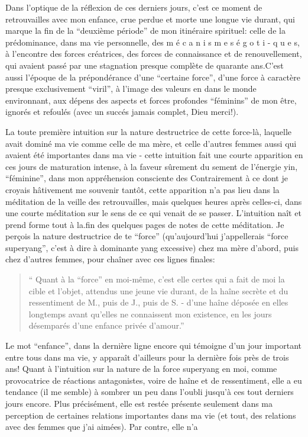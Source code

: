 
Dans l'optique de la réflexion de ces derniers jours, c'est ce moment de retrouvailles avec mon enfance, crue perdue et morte une longue vie durant, qui marque la fin de la ``deuxième période'' de mon itinéraire spirituel: celle de la prédominance, dans ma vie personnelle, des m é c a n i s m e s é g o t i - q u e s, à l'encontre des forces créatrices, des forces de connaissance et de renouvellement, qui avaient passé par une stagnation presque complète de quarante ans.C'est aussi l'époque de la prépondérance d'une ``certaine force'', d'une force à caractère presque exclusivement ``viril'', à l'image des valeurs en  dans le monde environnant, aux dépens des aspects et forces profondes ``féminins'' de mon être, ignorés et refoulés (avec un succés jamais complet, Dieu merci!).

La toute première intuition sur la nature destructrice de cette force-là, laquelle avait dominé ma vie comme celle de ma mère, et celle d'autres femmes aussi qui avaient été importantes dans ma vie - cette intuition fait une courte apparition en ces jours de maturation intense, à la faveur sûrement du \newline sement de l'énergie yin, ``féminine'', dans mon appréhension consciente des  Contrairement à ce dont je croyais hâtivement me souvenir tantôt, cette apparition n'a pas lieu dans la méditation de la veille des retrouvailles, mais quelques heures après celles-ci, dans une courte méditation sur le sens de ce qui venait de se passer. L'intuition naît et prend forme tout à la.fin des quelques pages de notes de cette méditation. Je perçois la nature destructrice de \newline te ``force'' (qu'aujourd'hui j'appellerais ``force superyang'', c'est à dire à dominante yang excessive) chez ma mère d'abord, puis chez d'autres femmes, pour chaîner avec ces lignes finales:

\begin{quote}
`` Quant à la ``force'' en moi-même, c'est elle certes qui a fait de moi la cible et l'objet, attendus une jeune vie durant, de la haîne secrète et du ressentiment de M., puis de J., puis de S. - d'une haîne déposée en elles longtemps avant qu'elles ne connaissent mon existence, en les jours désemparés d'une enfance privée d'amour.''
\end{quote}

Le mot ``enfance'', dans la dernière ligne encore qui témoigne d'un jour important entre tous dans ma vie, y apparaît d'ailleurs pour la dernière fois  près de trois ans! Quant à l'intuition sur la nature de la force superyang en moi, comme provocatrice de réactions antagonistes, voire de haîne et de ressentiment, elle a eu tendance (il me semble) à sombrer un peu dans l'oubli jusqu'à ces tout derniers jours encore. Plus précisément, elle est restée présente seulement dans ma perception de certaines relations importantes dans ma vie (et \newline tout, des relations avec des femmes que j'ai aimées). Par contre, elle n'a 

